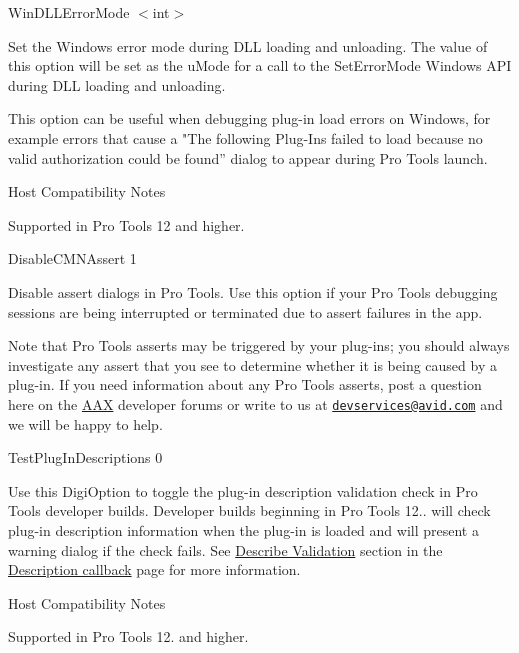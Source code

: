 \begin{DoxyItemize}
\item  {\ttfamily Win\+D\+L\+L\+Error\+Mode $<$int$>$}

Set the Windows error mode during D\+L\+L loading and unloading. The value of this option will be set as the {\ttfamily u\+Mode} for a call to the {\ttfamily Set\+Error\+Mode} Windows A\+P\+I during D\+L\+L loading and unloading.

This option can be useful when debugging plug-\/in load errors on Windows, for example errors that cause a "The following Plug-\/\+Ins failed to load because no valid authorization could be found” dialog to appear during Pro Tools launch.

\begin{DoxyRefDesc}{Host Compatibility Notes}
\item[\hyperlink{a00380__compatibility_notes000016}{Host Compatibility Notes}]Supported in Pro Tools 12 and higher.\end{DoxyRefDesc}





\item  {\ttfamily Disable\+C\+M\+N\+Assert 1}

Disable assert dialogs in Pro Tools. Use this option if your Pro Tools debugging sessions are being interrupted or terminated due to assert failures in the app.

Note that Pro Tools asserts may be triggered by your plug-\/ins; you should always investigate any assert that you see to determine whether it is being caused by a plug-\/in. If you need information about any Pro Tools asserts, post a question here on the \hyperlink{a00288}{A\+A\+X} developer forums or write to us at \href{mailto:devservices@avid.com}{\tt devservices@avid.\+com} and we will be happy to help. 


\item  {\ttfamily Test\+Plug\+In\+Descriptions 0}

Use this Digi\+Option to toggle the plug-\/in description validation check in Pro Tools developer builds. Developer builds beginning in Pro Tools 12.. will check plug-\/in description information when the plug-\/in is loaded and will present a warning dialog if the check fails. See \hyperlink{a00326_describe_validation}{Describe Validation} section in the \hyperlink{a00326}{Description callback} page for more information.

\begin{DoxyRefDesc}{Host Compatibility Notes}
\item[\hyperlink{a00380__compatibility_notes000017}{Host Compatibility Notes}]Supported in Pro Tools 12. and higher.\end{DoxyRefDesc}






\end{DoxyItemize}
